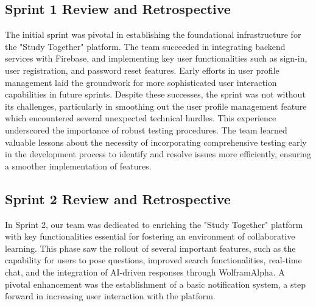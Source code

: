 

\subsection{Sprint 1 Review and Retrospective}\label{sprint1_review_retrospective}
The initial sprint was pivotal in establishing the foundational infrastructure for the "Study Together" platform. The team succeeded in integrating backend services with Firebase, and implementing key user functionalities such as sign-in, user registration, and password reset features. Early efforts in user profile management laid the groundwork for more sophisticated user interaction capabilities in future sprints. Despite these successes, the sprint was not without its challenges, particularly in smoothing out the user profile management feature which encountered several unexpected technical hurdles. This experience underscored the importance of robust testing procedures. The team learned valuable lessons about the necessity of incorporating comprehensive testing early in the development process to identify and resolve issues more efficiently, ensuring a smoother implementation of features.


\subsection{Sprint 2 Review and Retrospective}\label{sprint2_review_retrospective}
In Sprint 2, our team was dedicated to enriching the "Study Together" platform with key functionalities essential for fostering an environment of collaborative learning. This phase saw the rollout of several important features, such as the capability for users to pose questions, improved search functionalities, real-time chat, and the integration of AI-driven responses through WolframAlpha. A pivotal enhancement was the establishment of a basic notification system, a step forward in increasing user interaction with the platform.

